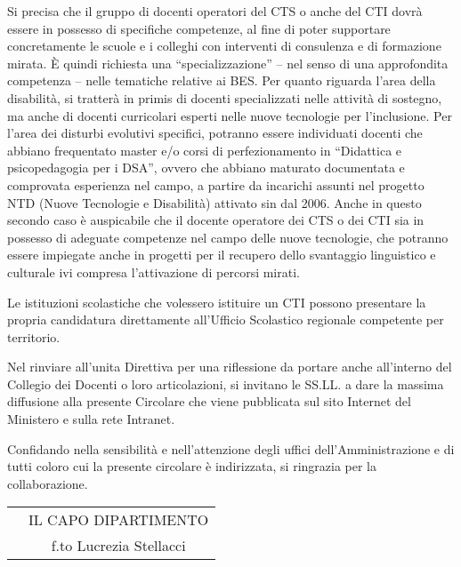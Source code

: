 Si precisa che il gruppo di docenti operatori del CTS o anche del CTI dovrà essere in possesso
di specifiche competenze, al fine di poter supportare concretamente le scuole e i colleghi con
interventi di consulenza e di formazione mirata. È quindi richiesta una “specializzazione” – nel
senso di una approfondita competenza – nelle tematiche relative ai BES. Per quanto riguarda l'area
della disabilità, si tratterà in primis di docenti specializzati nelle attività di sostegno, ma anche di
docenti curricolari esperti nelle nuove tecnologie per l'inclusione. Per l'area dei disturbi evolutivi
specifici, potranno essere individuati docenti che abbiano frequentato master e/o corsi di
perfezionamento in “Didattica e psicopedagogia per i DSA”, ovvero che abbiano maturato
documentata e comprovata esperienza nel campo, a partire da incarichi assunti nel progetto NTD
(Nuove Tecnologie e Disabilità) attivato sin dal 2006. Anche in questo secondo caso è auspicabile
che il docente operatore dei CTS o dei CTI sia in possesso di adeguate competenze nel campo delle
nuove tecnologie, che potranno essere impiegate anche in progetti per il recupero dello svantaggio
linguistico e culturale ivi compresa l'attivazione di percorsi mirati.

Le istituzioni scolastiche che volessero istituire un CTI possono presentare la propria
candidatura direttamente all'Ufficio Scolastico regionale competente per territorio.

Nel rinviare all'unita Direttiva per una riflessione da portare anche all'interno del Collegio dei
Docenti o loro articolazioni, si invitano le SS.LL. a dare la massima diffusione alla presente
Circolare che viene pubblicata sul sito Internet del Ministero e sulla rete Intranet.

Confidando nella sensibilità e nell'attenzione degli uffici dell'Amministrazione e di tutti coloro
cui la presente circolare è indirizzata, si ringrazia per la collaborazione.

\begin{tabular*}{\textwidth}%
	{@{\extracolsep{\fill}}lc}
	&IL CAPO DIPARTIMENTO\\
	&f.to Lucrezia Stellacci
\end{tabular*}



